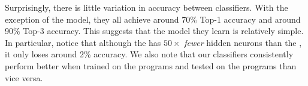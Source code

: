 Surprisingly, there is little variation in accuracy between classifiers.
With the exception of the \linear model, they all achieve around 70\%
Top-1 accuracy and around 90\% Top-3 accuracy.
%
This suggests that the model they learn is relatively simple.
%
In particular, notice that although the \hiddenT has $50\times$ \emph{fewer}
hidden neurons than the \hiddenFH, it only loses around 2\% accuracy.
%
We also note that our classifiers consistently perform better when
trained on the \FALL programs and tested on the \SPRING programs than
vice versa.
